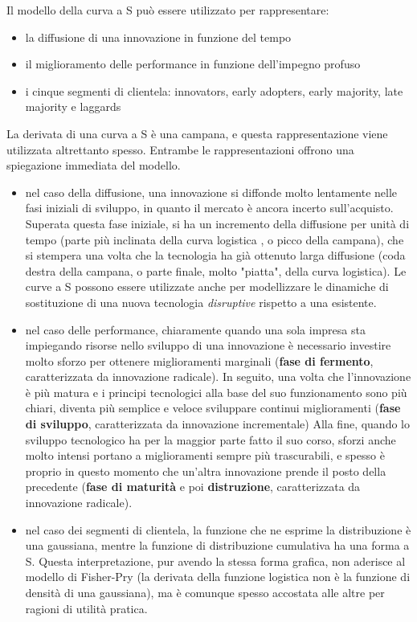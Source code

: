 \documentclass[answers, a4paper, 11pt]{exam}
\begin{document}
Il modello della curva a S può essere utilizzato per rappresentare:
\begin{itemize}
\item la diffusione di una innovazione in funzione del tempo
\item il miglioramento delle performance in funzione dell'impegno profuso
\item i cinque segmenti di clientela: innovators, early adopters, early majority, late majority e laggards
\end{itemize}

La derivata di una curva a S è una campana, e questa rappresentazione viene utilizzata altrettanto spesso. Entrambe le rappresentazioni offrono una spiegazione immediata del modello. 

\begin{itemize}
\item nel caso della diffusione, una innovazione si diffonde molto lentamente nelle fasi iniziali di sviluppo, in quanto il mercato è ancora incerto sull'acquisto. Superata questa fase iniziale, si ha un incremento della diffusione per unità di tempo (parte più inclinata della curva logistica , o picco della campana), che si stempera una volta che la tecnologia ha già ottenuto larga diffusione (coda destra della campana, o parte finale, molto "piatta", della curva logistica). Le curve a S possono essere utilizzate anche per modellizzare le dinamiche di sostituzione di una nuova tecnologia \emph{disruptive} rispetto a una esistente.
\item nel caso delle performance, chiaramente quando una sola impresa sta impiegando risorse nello sviluppo di una innovazione è necessario investire molto sforzo per ottenere miglioramenti marginali (\textbf{fase di fermento}, caratterizzata da innovazione radicale). In seguito, una volta che l'innovazione è più matura e i principi tecnologici alla base del suo funzionamento sono più chiari, diventa più semplice e veloce sviluppare continui miglioramenti (\textbf{fase di sviluppo}, caratterizzata da innovazione incrementale) Alla fine, quando lo sviluppo tecnologico ha per la maggior parte fatto il suo corso, sforzi anche molto intensi portano a miglioramenti sempre più trascurabili, e spesso è proprio in questo momento che un'altra innovazione prende il posto della precedente (\textbf{fase di maturità} e poi \textbf{distruzione}, caratterizzata da innovazione radicale).
\item nel caso dei segmenti di clientela, la funzione che ne esprime la distribuzione è una gaussiana, mentre la funzione di distribuzione cumulativa ha una forma a S. Questa interpretazione, pur avendo la stessa forma grafica, non aderisce al modello di Fisher-Pry (la derivata della funzione logistica non è la funzione di densità di una gaussiana), ma è comunque spesso accostata alle altre per ragioni di utilità pratica.
\end{itemize}
\end{document}
